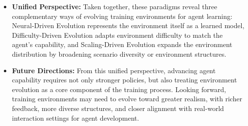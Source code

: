 \begin{tcolorbox}[takeaway,title={Takeaway 7}]
\begin{itemize}
\item \textbf{Unified Perspective:}
%
%
Taken together, these paradigms reveal three complementary ways of evolving training environments for agent learning:
Neural-Driven Evolution represents the environment itself as a learned model,
Difficulty-Driven Evolution adapts environment difficulty to match the agent's capability,
and Scaling-Driven Evolution expands the environment distribution by broadening scenario diversity or environment structures.
%
\item \textbf{Future Directions:} From this unified perspective, advancing agent capability requires not only stronger policies, but also treating environment evolution as a core component of the training process.
Looking forward, training environments may need to evolve toward greater realism, with richer feedback, more diverse structures, and closer alignment with real-world interaction settings for agent development.


\end{itemize}
\end{tcolorbox}